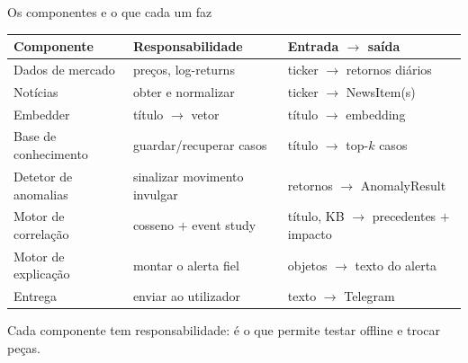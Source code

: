\documentclass[aspectratio=169,11pt]{beamer}
\newcommand{\key}[1]{\textbf{\structure{#1}}}
\begin{document}
\begin{frame}{Os componentes e o que cada um faz}
\centering\scriptsize
\begin{tabular}{@{}p{3.0cm} p{4.0cm} p{4.2cm}@{}}
\toprule
\textbf{Componente} & \textbf{Responsabilidade} & \textbf{Entrada $\to$ saída} \\
\midrule
Dados de mercado & preços, log-returns & ticker $\to$ retornos diários \\
Notícias & obter e normalizar & ticker $\to$ NewsItem(s) \\
Embedder & título $\to$ vetor & título $\to$ embedding \\
Base de conhecimento & guardar/recuperar casos & título $\to$ top-$k$ casos \\
Detetor de anomalias & sinalizar movimento invulgar & retornos $\to$ AnomalyResult \\
Motor de correlação & cosseno $+$ event study & título, KB $\to$ precedentes $+$ impacto \\
Motor de explicação & montar o alerta fiel & objetos $\to$ texto do alerta \\
Entrega & enviar ao utilizador & texto $\to$ Telegram \\
\bottomrule
\end{tabular}
\vspace{1mm}

\footnotesize Cada componente tem \key{uma} responsabilidade: é o que permite testar offline e trocar peças.
\end{frame}
\end{document}
